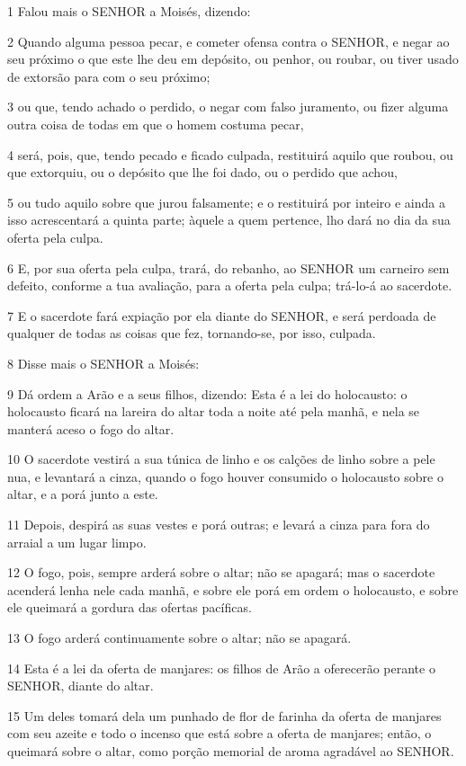 \par 1 Falou mais o SENHOR a Moisés, dizendo:
\par 2 Quando alguma pessoa pecar, e cometer ofensa contra o SENHOR, e negar ao seu próximo o que este lhe deu em depósito, ou penhor, ou roubar, ou tiver usado de extorsão para com o seu próximo;
\par 3 ou que, tendo achado o perdido, o negar com falso juramento, ou fizer alguma outra coisa de todas em que o homem costuma pecar,
\par 4 será, pois, que, tendo pecado e ficado culpada, restituirá aquilo que roubou, ou que extorquiu, ou o depósito que lhe foi dado, ou o perdido que achou,
\par 5 ou tudo aquilo sobre que jurou falsamente; e o restituirá por inteiro e ainda a isso acrescentará a quinta parte; àquele a quem pertence, lho dará no dia da sua oferta pela culpa.
\par 6 E, por sua oferta pela culpa, trará, do rebanho, ao SENHOR um carneiro sem defeito, conforme a tua avaliação, para a oferta pela culpa; trá-lo-á ao sacerdote.
\par 7 E o sacerdote fará expiação por ela diante do SENHOR, e será perdoada de qualquer de todas as coisas que fez, tornando-se, por isso, culpada.
\par 8 Disse mais o SENHOR a Moisés:
\par 9 Dá ordem a Arão e a seus filhos, dizendo: Esta é a lei do holocausto: o holocausto ficará na lareira do altar toda a noite até pela manhã, e nela se manterá aceso o fogo do altar.
\par 10 O sacerdote vestirá a sua túnica de linho e os calções de linho sobre a pele nua, e levantará a cinza, quando o fogo houver consumido o holocausto sobre o altar, e a porá junto a este.
\par 11 Depois, despirá as suas vestes e porá outras; e levará a cinza para fora do arraial a um lugar limpo.
\par 12 O fogo, pois, sempre arderá sobre o altar; não se apagará; mas o sacerdote acenderá lenha nele cada manhã, e sobre ele porá em ordem o holocausto, e sobre ele queimará a gordura das ofertas pacíficas.
\par 13 O fogo arderá continuamente sobre o altar; não se apagará.
\par 14 Esta é a lei da oferta de manjares: os filhos de Arão a oferecerão perante o SENHOR, diante do altar.
\par 15 Um deles tomará dela um punhado de flor de farinha da oferta de manjares com seu azeite e todo o incenso que está sobre a oferta de manjares; então, o queimará sobre o altar, como porção memorial de aroma agradável ao SENHOR.
